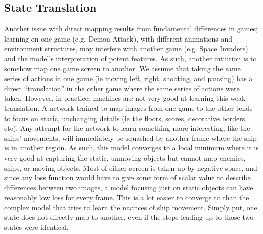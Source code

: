\documentclass{article} %
\begin{document}
\subsection{State Translation}
Another issue with direct mapping results from fundamental differences in games; learning on one
game (e.g. Demon Attack), with different animations and environment structures, may interfere with
another game (e.g. Space Invaders) and the model's interpretation of potent features.  As such,
another intuition is to somehow map one game screen to another. We assume that taking the same
series of actions in one game (ie moving left, right, shooting, and pausing) has a direct
``translation'' in the other game where the same series of actions were taken.  However, in practice,
machines are not very good at learning this weak translation. A network trained to map images from
one game to the other tends to focus on static, unchanging details (ie the floors, scores,
decorative borders, etc). Any attempt for the network to learn something more interesting, like the
ships' movements, will immediately be squashed by another frame where the ship is in another region.
As such, this model converges to a local minimum where it is very good at capturing the static,
unmoving objects but cannot map enemies, ships, or moving objects. Most of either screen is taken up
by negative space, and since any loss function would have to give some form of scalar value to
describe differences between two images, a model focusing just on static objects can have reasonably
low loss for every frame. This is a lot easier to converge to than the complex model that tries to
learn the nuances of ship movement. Simply put, one state does not directly map to another, even if
the steps leading up to those two states were identical.
\end{document}
